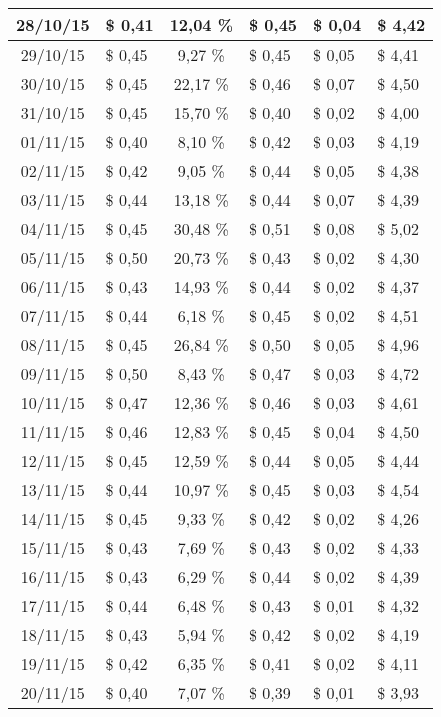 \begin{center}
\begin{small}
\begin{longtable}{|c|l|c|l|l|l|}
28/10/15 & \$ 0,41 & 12,04 \% & \$ 0,45 & \$ 0,04 & \$ 4,42 \\ \hline
29/10/15 & \$ 0,45 & 9,27 \% & \$ 0,45 & \$ 0,05 & \$ 4,41 \\ \hline
30/10/15 & \$ 0,45 & 22,17 \% & \$ 0,46 & \$ 0,07 & \$ 4,50 \\ \hline
31/10/15 & \$ 0,45 & 15,70 \% & \$ 0,40 & \$ 0,02 & \$ 4,00 \\ \hline
01/11/15 & \$ 0,40 & 8,10 \% & \$ 0,42 & \$ 0,03 & \$ 4,19 \\ \hline
02/11/15 & \$ 0,42 & 9,05 \% & \$ 0,44 & \$ 0,05 & \$ 4,38 \\ \hline
03/11/15 & \$ 0,44 & 13,18 \% & \$ 0,44 & \$ 0,07 & \$ 4,39 \\ \hline
04/11/15 & \$ 0,45 & 30,48 \% & \$ 0,51 & \$ 0,08 & \$ 5,02 \\ \hline
05/11/15 & \$ 0,50 & 20,73 \% & \$ 0,43 & \$ 0,02 & \$ 4,30 \\ \hline
06/11/15 & \$ 0,43 & 14,93 \% & \$ 0,44 & \$ 0,02 & \$ 4,37 \\ \hline
07/11/15 & \$ 0,44 & 6,18 \% & \$ 0,45 & \$ 0,02 & \$ 4,51 \\ \hline
08/11/15 & \$ 0,45 & 26,84 \% & \$ 0,50 & \$ 0,05 & \$ 4,96 \\ \hline
09/11/15 & \$ 0,50 & 8,43 \% & \$ 0,47 & \$ 0,03 & \$ 4,72 \\ \hline
10/11/15 & \$ 0,47 & 12,36 \% & \$ 0,46 & \$ 0,03 & \$ 4,61 \\ \hline
11/11/15 & \$ 0,46 & 12,83 \% & \$ 0,45 & \$ 0,04 & \$ 4,50 \\ \hline
12/11/15 & \$ 0,45 & 12,59 \% & \$ 0,44 & \$ 0,05 & \$ 4,44 \\ \hline
13/11/15 & \$ 0,44 & 10,97 \% & \$ 0,45 & \$ 0,03 & \$ 4,54 \\ \hline
14/11/15 & \$ 0,45 & 9,33 \% & \$ 0,42 & \$ 0,02 & \$ 4,26 \\ \hline
15/11/15 & \$ 0,43 & 7,69 \% & \$ 0,43 & \$ 0,02 & \$ 4,33 \\ \hline
16/11/15 & \$ 0,43 & 6,29 \% & \$ 0,44 & \$ 0,02 & \$ 4,39 \\ \hline
17/11/15 & \$ 0,44 & 6,48 \% & \$ 0,43 & \$ 0,01 & \$ 4,32 \\ \hline
18/11/15 & \$ 0,43 & 5,94 \% & \$ 0,42 & \$ 0,02 & \$ 4,19 \\ \hline
19/11/15 & \$ 0,42 & 6,35 \% & \$ 0,41 & \$ 0,02 & \$ 4,11 \\ \hline
20/11/15 & \$ 0,40 & 7,07 \% & \$ 0,39 & \$ 0,01 & \$ 3,93 \\ \hline

\end{longtable}
\end{small}
\end{center}
